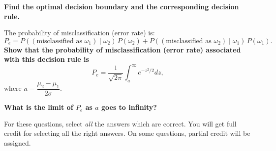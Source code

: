 \begin{Parts}

\Part \textbf{Find the optimal decision boundary and the corresponding decision rule.}



\Part The probability of misclassification (error rate) is:
$$P_{e} = P((\text{misclassified as }\omega_{1}) \mid \omega_{2}) \, P(\omega_{2}) + P((\text{misclassified as }\omega_{2}) \mid \omega_{1}) \, P(\omega_{1}).$$
\textbf{Show that the probability of misclassification (error rate) associated with this decision rule is}
\begin{equation*}
P_e=\frac{1}{\sqrt{2\pi}}\int_{a}^{\infty} e^{-z^{2}/2}dz,
\end{equation*}
where $a=\dfrac{\mu_2 - \mu_1}{2\sigma}$.



\Part \textbf{What is the limit of $P_e$ as $a$ goes to infinity?}


\end{Parts}

For these questions, select \emph{all} the answers which are correct.
You will get full credit for selecting all the right answers.
On some questions, partial credit will be assigned.

